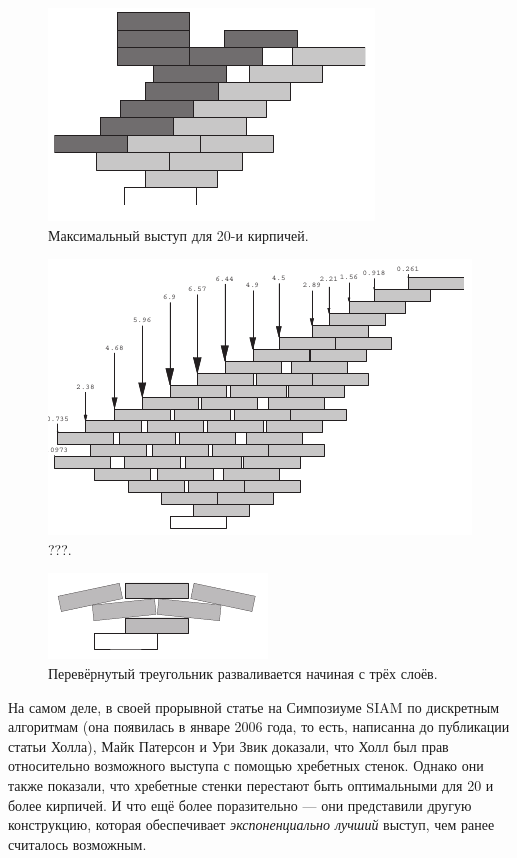 \begin{figure}[htb!]
\centering
\includegraphics[scale=1]{pics/kirpich3}
\caption{Максимальный выступ для 20-и кирпичей.}
\label{pic:kirpich3}
\end{figure}

\begin{figure}[htb!]
\centering
\includegraphics[scale=1]{pics/kirpich4}
\caption{???.}
\label{pic:kirpich4}
\end{figure}

\begin{figure}[htb!]
\centering
\includegraphics[scale=1]{pics/kirpich5}
\caption{Перевёрнутый треугольник разваливается начиная с трёх слоёв.}
\label{pic:kirpich5}
\end{figure}

На самом деле, в своей прорывной статье \cite{47} на Симпозиуме SIAM по дискретным алгоритмам (она появилась в январе 2006 года, то есть, написанна до публикации статьи Холла), Майк Патерсон и Ури Звик доказали, что Холл был прав относительно возможного выступа с помощью хребетных стенок.
Однако они также показали, что хребетные стенки перестают быть оптимальными для 20 и более кирпичей.
И что ещё более поразительно --- они представили другую конструкцию, которая обеспечивает \emph{экспоненциально лучший} выступ, чем ранее считалось возможным.

